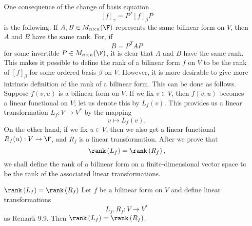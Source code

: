 \documentclass[linearalgebra]{subfiles}
\begin{document}
    \begin{remark}
        One consequence of the change of basis equation
        \begin{equation*}
            \left[ f \right] _\gamma = P^T\left[ f \right] _\beta P
        \end{equation*}
        is the following. If $A,B\in M_{n\times n}(\F)$ represents the same bilinear form on $V$, then $A$ and $B$ have the same rank. For, if
        \begin{equation*}
            B = P^TAP
        \end{equation*}
        for some invertible $P\in M_{n\times n}(\F)$, it is clear that $A$ and $B$ have the same rank. This makes it possible to define the rank of a bilinear form $f$ on $V$ to be the rank of $\left[ f \right] _\beta$ for some ordered basis $\beta$ on $V$. However, it is more desirable to give more intrinsic definition of the rank of a bilinear form. This can be done as follows. Suppose $f\left( v,u \right)$ is a bilinear form on $V$. If we fix $v\in V$, then $f(v,u)$ becomes a linear functional on $V$; let us denote this by $L_f(v)$. This provides us a linear transformation $L_f:V\to V^*$ by the mapping
        \begin{equation*}
            v\mapsto L_f(v).
        \end{equation*}
        On the other hand, if we fix $u\in V$, then we also get a linear functional $R_f(u):V\to \F$, and $R_f$ is a linear transformation. After we prove that
        \begin{equation*}
            \rank\left( L_f \right) = \rank\left( R_f \right),
        \end{equation*}
        we shall define the rank of a bilinear form on a finite-dimensional vector space to be the rank of the associated linear transformations.
    \end{remark}

    \begin{prop}{$\rank\left( L_f \right) = \rank\left( R_f \right)$}
        Let $f$ be a bilinear form on $V$ and define linear transformations
        \begin{equation*}
            L_f,R_f:V\to V^*
        \end{equation*}
        as Remark 9.9. Then $\rank\left( L_f \right) = \rank\left( R_f \right)$.
    \end{prop}
\end{document}
